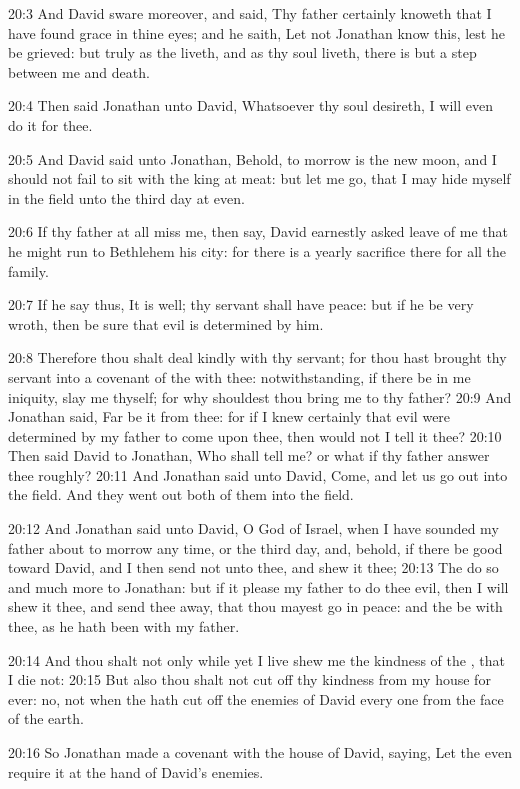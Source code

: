 20:3 And David sware moreover, and said, Thy father certainly knoweth that I have found grace in thine eyes; and he saith, Let not Jonathan know this, lest he be grieved: but truly as the \LORD liveth, and as thy soul liveth, there is but a step between me and death.

20:4 Then said Jonathan unto David, Whatsoever thy soul desireth, I will even do it for thee.

20:5 And David said unto Jonathan, Behold, to morrow is the new moon, and I should not fail to sit with the king at meat: but let me go, that I may hide myself in the field unto the third day at even.

20:6 If thy father at all miss me, then say, David earnestly asked leave of me that he might run to Bethlehem his city: for there is a yearly sacrifice there for all the family.

20:7 If he say thus, It is well; thy servant shall have peace: but if he be very wroth, then be sure that evil is determined by him.

20:8 Therefore thou shalt deal kindly with thy servant; for thou hast brought thy servant into a covenant of the \LORD with thee: notwithstanding, if there be in me iniquity, slay me thyself; for why shouldest thou bring me to thy father?  20:9 And Jonathan said, Far be it from thee: for if I knew certainly that evil were determined by my father to come upon thee, then would not I tell it thee?  20:10 Then said David to Jonathan, Who shall tell me? or what if thy father answer thee roughly?  20:11 And Jonathan said unto David, Come, and let us go out into the field. And they went out both of them into the field.

20:12 And Jonathan said unto David, O \LORD God of Israel, when I have sounded my father about to morrow any time, or the third day, and, behold, if there be good toward David, and I then send not unto thee, and shew it thee; 20:13 The \LORD do so and much more to Jonathan: but if it please my father to do thee evil, then I will shew it thee, and send thee away, that thou mayest go in peace: and the \LORD be with thee, as he hath been with my father.

20:14 And thou shalt not only while yet I live shew me the kindness of the \LORD, that I die not: 20:15 But also thou shalt not cut off thy kindness from my house for ever: no, not when the \LORD hath cut off the enemies of David every one from the face of the earth.

20:16 So Jonathan made a covenant with the house of David, saying, Let the \LORD even require it at the hand of David's enemies.


